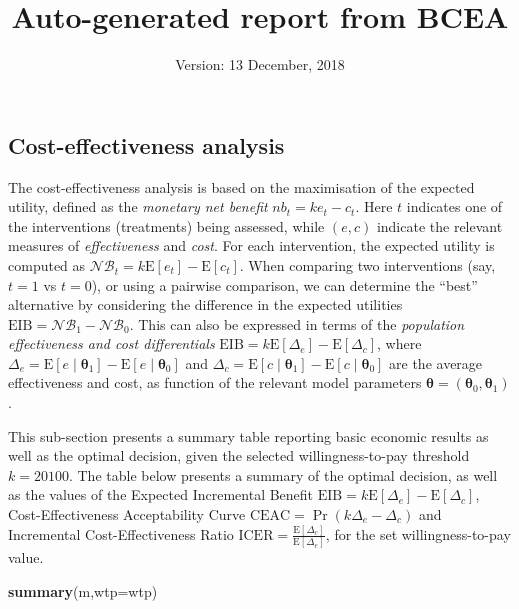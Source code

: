 \documentclass[]{article}
\title{Auto-generated report from BCEA}
\author{}
\date{Version: 13 December, 2018}
\newenvironment{Shaded}{\begin{snugshade}}{\end{snugshade}}
\newcommand{\DataTypeTok}[1]{\textcolor[rgb]{0.13,0.29,0.53}{#1}}
\newcommand{\KeywordTok}[1]{\textcolor[rgb]{0.13,0.29,0.53}{\textbf{#1}}}
\newcommand{\NormalTok}[1]{#1}
\begin{document}
\maketitle

\hypertarget{cost-effectiveness-analysis}{%
\subsection{Cost-effectiveness
analysis}\label{cost-effectiveness-analysis}}

The cost-effectiveness analysis is based on the maximisation of the
expected utility, defined as the \emph{monetary net benefit}
\(nb_t=ke_t-c_t\). Here \(t\) indicates one of the interventions
(treatments) being assessed, while \((e,c)\) indicate the relevant
measures of \emph{effectiveness} and \emph{cost}. For each intervention,
the expected utility is computed as
\(\mathcal{NB}_t=k\mbox{E}[e_t]-\mbox{E}[c_t]\). When comparing two
interventions (say, \(t=1\) vs \(t=0\)), or using a pairwise comparison,
we can determine the ``best'' alternative by considering the difference
in the expected utilities \(\mbox{EIB}=\mathcal{NB}_1-\mathcal{NB}_0\).
This can also be expressed in terms of the \emph{population
effectiveness and cost differentials}
\(\mbox{EIB}=k\mbox{E}[\Delta_e]-\mbox{E}[\Delta_c]\), where
\(\Delta_e=\mbox{E}[e\mid\bm\theta_1]-\mbox{E}[e\mid\bm\theta_0]\) and
\(\Delta_c=\mbox{E}[c\mid\bm\theta_1]-\mbox{E}[c\mid\bm\theta_0]\) are
the average effectiveness and cost, as function of the relevant model
parameters \(\bm\theta=(\bm\theta_0,\bm\theta_1)\).

This sub-section presents a summary table reporting basic economic
results as well as the optimal decision, given the selected
willingness-to-pay threshold \(k=20100\). The table below presents a
summary of the optimal decision, as well as the values of the Expected
Incremental Benefit
\(\mbox{EIB}=k\mbox{E}[\Delta_e]-\mbox{E}[\Delta_c]\),
Cost-Effectiveness Acceptability Curve
\(\mbox{CEAC}=\Pr(k\Delta_e-\Delta_c)\) and Incremental
Cost-Effectiveness Ratio
\(\mbox{ICER}=\displaystyle\frac{\mbox{E}[\Delta_c]}{\mbox{E}[\Delta_e]}\),
for the set willingness-to-pay value.

\begin{Shaded}
\begin{Highlighting}[]
\KeywordTok{summary}\NormalTok{(m,}\DataTypeTok{wtp=}\NormalTok{wtp)}
\end{Highlighting}
\end{Shaded}
\end{document}
